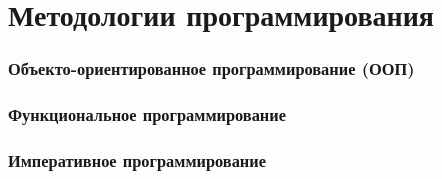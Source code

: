 \part{Методологии программирования}

	\section{Объекто-ориентированное программирование (ООП) \label{method:oop} }
	\section{Функциональное программирование\label{method:func}}
	\section{Императивное программирование\label{method:imperat}}
	